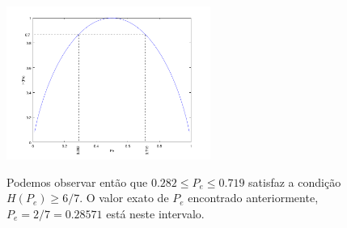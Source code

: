 \begin{questions}
\begin{solution}
\begin{parts}
{\centering
\includegraphics[width=0.5\textwidth]{../images/errorentropy.pdf}
}

Podemos observar então que $0.282 \leq P_e \leq 0.719$ satisfaz a condição $H(P_e) \geq 6/7$.
O valor exato de $P_e$ encontrado anteriormente, $P_e = 2/7 = 0.28571$ está neste intervalo.


\end{parts}
\end{solution}
\end{questions}
